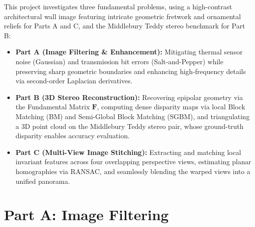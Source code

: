 \documentclass[a4paper,12pt]{article}
\begin{document}
This project investigates three fundamental problems, using a high-contrast architectural wall image featuring intricate geometric fretwork and ornamental reliefs for Parts A and C, and the Middlebury Teddy stereo benchmark for Part B:
\begin{itemize}
    \item \textbf{Part A (Image Filtering \& Enhancement):} Mitigating thermal sensor noise (Gaussian) and transmission bit errors (Salt-and-Pepper) while preserving sharp geometric boundaries and enhancing high-frequency details via second-order Laplacian derivatives.
    \item \textbf{Part B (3D Stereo Reconstruction):} Recovering epipolar geometry via the Fundamental Matrix $\mathbf{F}$, computing dense disparity maps via local Block Matching (BM) and Semi-Global Block Matching (SGBM), and triangulating a 3D point cloud on the Middlebury Teddy stereo pair, whose ground-truth disparity enables accuracy evaluation.
    \item \textbf{Part C (Multi-View Image Stitching):} Extracting and matching local invariant features across four overlapping perspective views, estimating planar homographies via RANSAC, and seamlessly blending the warped views into a unified panorama.
\end{itemize}

\section{Part A: Image Filtering}
\end{document}
